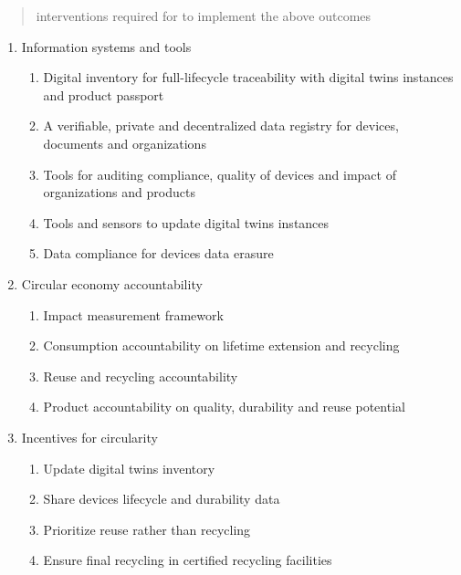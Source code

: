 \documentclass[
]{book}
\begin{document}
\begin{quote}
interventions required for to implement the above outcomes
\end{quote}

\begin{enumerate}
\def\labelenumi{\alph{enumi}.}
\item
  Information systems and tools

  \begin{enumerate}
  \def\labelenumii{\arabic{enumii}.}
  \item
    Digital inventory for full-lifecycle traceability with digital twins instances and product passport
  \item
    A verifiable, private and decentralized data registry for devices, documents and organizations
  \item
    Tools for auditing compliance, quality of devices and impact of organizations and products
  \item
    Tools and sensors to update digital twins instances
  \item
    Data compliance for devices data erasure
  \end{enumerate}
\item
  Circular economy accountability

  \begin{enumerate}
  \def\labelenumii{\arabic{enumii}.}
  \item
    Impact measurement framework
  \item
    Consumption accountability on lifetime extension and recycling
  \item
    Reuse and recycling accountability
  \item
    Product accountability on quality, durability and reuse potential
  \end{enumerate}
\item
  Incentives for circularity

  \begin{enumerate}
  \def\labelenumii{\arabic{enumii}.}
  \item
    Update digital twins inventory
  \item
    Share devices lifecycle and durability data
  \item
    Prioritize reuse rather than recycling
  \item
    Ensure final recycling in certified recycling facilities
  \end{enumerate}
\end{enumerate}
\end{document}
